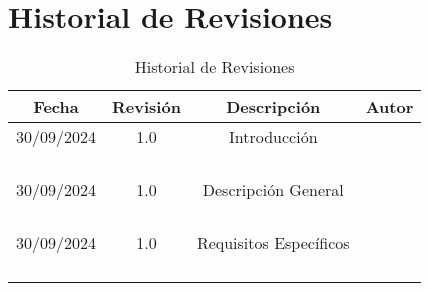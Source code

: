     \restoregeometry %

    \clearpage
    \tableofcontents

    \clearpage
    \listoffigures

    \clearpage


    \clearpage
    \vspace*{6pt}
	\centerline{\textbf{\huge \theTitle}}
    \vspace*{8pt}

	\section*{Historial de Revisiones}

	\begin{table}[h!]
		\centering
		\begin{tabular}{|c|c|c|c|}
			\hline
			\textbf{Fecha} & \textbf{Revisión} & \textbf{Descripción}   & \textbf{Autor} \\
			\hline
			30/09/2024     & 1.0               & Introducción           & \bAuthor       \\
			               &                   &                        & \cAuthor       \\
			               &                   &                        & \dAuthor       \\
			               &                   &                        & \eAuthor       \\
			               &                   &                        & \theAuthor     \\
			\hline
			30/09/2024     & 1.0               & Descripción General    & \bAuthor       \\
			               &                   &                        & \cAuthor       \\
			               &                   &                        & \dAuthor       \\
			               &                   &                        & \eAuthor       \\
			               &                   &                        & \theAuthor     \\
			\hline
			30/09/2024     & 1.0               & Requisitos Específicos & \bAuthor       \\
			               &                   &                        & \cAuthor       \\
			               &                   &                        & \dAuthor       \\
			               &                   &                        & \eAuthor       \\
			               &                   &                        & \theAuthor     \\
			\hline
		\end{tabular}
		\caption{Historial de Revisiones}
	\end{table}

